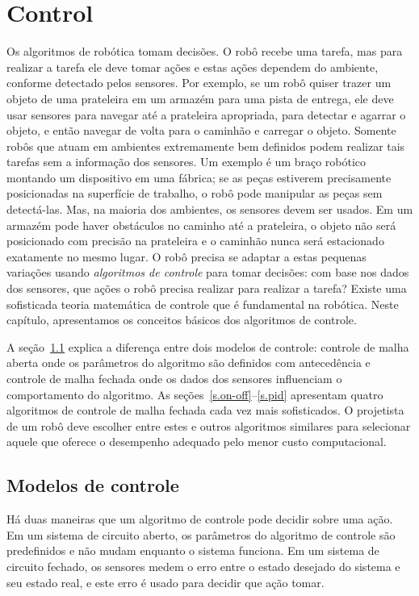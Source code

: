 
\chapter{Control}\label{ch.control}

Os algoritmos de robótica tomam decisões. O robô recebe uma tarefa, mas para realizar a tarefa ele deve tomar ações e estas ações dependem do ambiente, conforme detectado pelos sensores. Por exemplo, se um robô quiser trazer um objeto de uma prateleira em um armazém para uma pista de entrega, ele deve usar sensores para navegar até a prateleira apropriada, para detectar e agarrar o objeto, e então navegar de volta para o caminhão e carregar o objeto. Somente robôs que atuam em ambientes extremamente bem definidos podem realizar tais tarefas sem a informação dos sensores. Um exemplo é um braço robótico montando um dispositivo em uma fábrica; se as peças estiverem precisamente posicionadas na superfície de trabalho, o robô pode manipular as peças sem detectá-las. Mas, na maioria dos ambientes, os sensores devem ser usados. Em um armazém pode haver obstáculos no caminho até a prateleira, o objeto não será posicionado com precisão na prateleira e o caminhão nunca será estacionado exatamente no mesmo lugar. O robô precisa se adaptar a estas pequenas variações usando \emph{algoritmos de controle} para tomar decisões: com base nos dados dos sensores, que ações o robô precisa realizar para realizar a tarefa? Existe uma sofisticada teoria matemática de controle que é fundamental na robótica. Neste capítulo, apresentamos os conceitos básicos dos algoritmos de controle.

A seção~\ref{s.control-model} explica a diferença entre dois modelos de controle: controle de malha aberta onde os parâmetros do algoritmo são definidos com antecedência e controle de malha fechada onde os dados dos sensores influenciam o comportamento do algoritmo. As seções~\ref{s.on-off}--\ref{s.pid} apresentam quatro algoritmos de controle de malha fechada cada vez mais sofisticados. O projetista de um robô deve escolher entre estes e outros algoritmos similares para selecionar aquele que oferece o desempenho adequado pelo menor custo computacional.

\section{Modelos de controle}\label{s.control-model}

Há duas maneiras que um algoritmo de controle pode decidir sobre uma ação. Em um sistema de circuito aberto, os parâmetros do algoritmo de controle são predefinidos e não mudam enquanto o sistema funciona. Em um sistema de circuito fechado, os sensores medem o erro entre o estado desejado do sistema e seu estado real, e este erro é usado para decidir que ação tomar.

